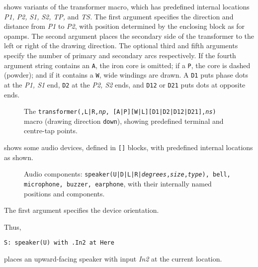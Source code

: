  shows variants of the transformer macro,
which has predefined internal locations
{\sl P1,} {\sl P2,} {\sl S1,} {\sl S2,} {\sl TP,} and {\sl TS.}
The first argument
specifies the direction and distance from {\sl P1} to {\sl P2}, with
position determined by the enclosing block as for opamps.  The second
argument places the secondary side of the transformer to the left
or right of the drawing direction.  The optional third and fifth arguments
specify the number of primary and secondary arcs respectively.
If the fourth argument string contains an {\tt A}, the iron core
is omitted; 
if a {\tt P}, the core is dashed (powder);
and if it contains a {\tt W}, wide windings are drawn.
A {\tt D1} puts phase dots at the {\sl P1, S1} end, {\tt D2} at the
{\sl P2, S2} ends, and {\tt D12} or {\tt D21} puts dots at opposite ends.
\begin{figure}[h!t]
   
  \caption{The {\tt transformer(\linespec,L|R,{\sl np},%
[A|P][W|L][D1|D2|D12|D21],{\sl ns})}
     macro (drawing direction {\tt down}), showing predefined terminal
     and centre-tap points.}
   \label{Xform}
   \end{figure}

\pagebreak
{} shows some audio devices, defined in {\tt []} blocks,
with predefined internal locations as shown.
\begin{figure}[h!t]
   
   \caption{Audio components:
   {\tt speaker(U|D|L|R|{\sl degrees},{\sl size},{\sl type}),
     bell, microphone, buzzer,
     earphone}, with their internally named positions and components.}
   \label{Audio}
   \end{figure}
The first argument specifies the device orientation.

Thus,

{\tt S: speaker(U) with .In2 at Here}

\noindent
places an upward-facing speaker with input {\sl In2} at the
current location.

